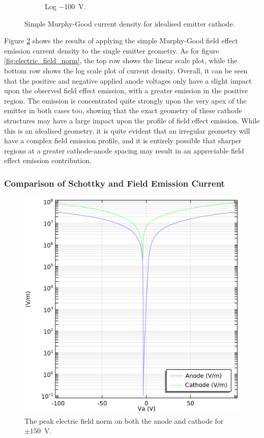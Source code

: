 \begin{refsection}
\begin{figure}[H]
\begin{subfigure}[b]{0.45\linewidth}
        \caption{Log $-100$~\si{\volt}.}
        \label{fig:c_-100_log_j_gm}
    \end{subfigure}
    
    \caption{Simple Murphy-Good current density for idealised emitter cathode.}
    \label{fig:field_emission}
\end{figure}

Figure \ref{fig:field_emission} shows the results of applying the simple Murphy-Good field effect emission current density to the single emitter geometry. As for figure \ref{fig:electric_field_norm}, the top row shows the linear scale plot, while the bottom row shows the log scale plot of current density. Overall, it can be seen that the positive and negative applied anode voltages only have a slight impact upon the observed field effect emission, with a greater emission in the positive region. The emission is concentrated quite strongly upon the very apex of the emitter in both cases too, showing that the exact geometry of these cathode structures may have a large impact upon the profile of field effect emission. While this is an idealised geometry, it is quite evident that an irregular geometry will have a complex field emission profile, and it is entirely possible that sharper regions at a greater cathode-anode spacing may result in an appreciable field effect emission contribution. 

\subsubsection{Comparison of Schottky and Field Emission Current}
\begin{figure}
    \centering
    \includegraphics[width=\linewidth]{Chapter7/Figs/Raster/Comsol/cathode_anode_comparison.png}
    \caption{The peak electric field norm on both the anode and cathode for $\pm150$~\si{\volt}.}
    \label{fig:c_cathode_anode_comparison}
\end{figure}


\end{refsection}
